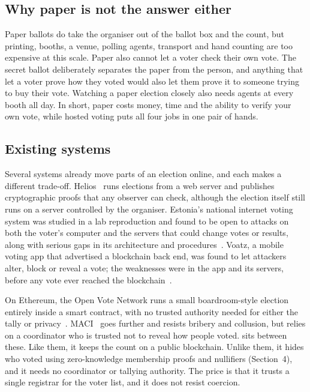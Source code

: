\subsection{Why paper is not the answer either}

Paper ballots do take the organiser out of the ballot box and the count, but
printing, booths, a venue, polling agents, transport and hand counting are too
expensive at this scale. Paper also cannot let a voter check their own vote.
The secret ballot deliberately separates the paper from the person, and
anything that let a voter prove how they voted would also let them prove it to
someone trying to buy their vote. Watching a paper election closely also needs
agents at every booth all day. In short, paper costs money, time and the
ability to verify your own vote, while hosted voting puts all four jobs in one
pair of hands.

\subsection{Existing systems}

Several systems already move parts of an election online, and each makes a
different trade-off. Helios~\cite{helios} runs elections from a web server and
publishes cryptographic proofs that any observer can check, although the
election itself still runs on a server controlled by the organiser. Estonia's
national internet voting system was studied in a lab reproduction and found to
be open to attacks on both the voter's computer and the servers that could
change votes or results, along with serious gaps in its architecture and
procedures~\cite{estonia}. Voatz, a mobile voting app that advertised a
blockchain back end, was found to let attackers alter, block or reveal a vote;
the weaknesses were in the app and its servers, before any vote ever reached
the blockchain~\cite{voatz}.

On Ethereum, the Open Vote Network runs a small boardroom-style election
entirely inside a smart contract, with no trusted authority needed for either
the tally or privacy~\cite{openvote}. MACI~\cite{maci} goes further and resists
bribery and collusion, but relies on a coordinator who is trusted not to reveal
how people voted. \projectname{} sits between these. Like them, it keeps the
count on a public blockchain. Unlike them, it hides who voted using
zero-knowledge membership proofs and nullifiers (Section~4), and it needs no
coordinator or tallying authority. The price is that it trusts a single
registrar for the voter list, and it does not resist coercion.

